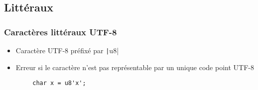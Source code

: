 \documentclass[C++.tex]{subfiles}
\begin{document}
\subsection*{Littéraux}
\begin{frame}[fragile]
	\frametitle{Caractères littéraux UTF-8}
	\begin{itemize}
		\item Caractère UTF-8 préfixé par \texttt|u8|
		\item Erreur si le caractère n'est pas représentable par un unique code point UTF-8
	\end{itemize}

	\begin{verbatim}
		char x = u8'x';
	\end{verbatim}

\end{frame}
\end{document}
